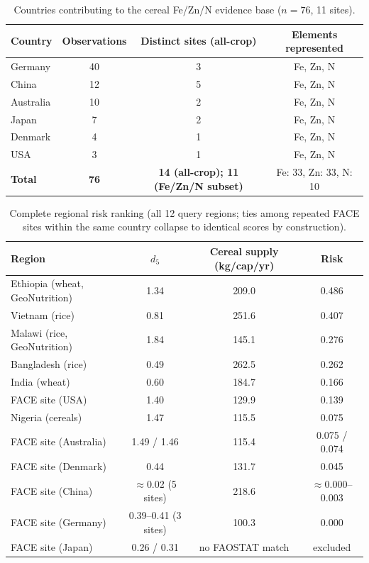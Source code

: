 \documentclass{article}
\begin{document}
\begin{table}[h]
\centering
\small
\caption{Countries contributing to the cereal Fe/Zn/N evidence base ($n=76$, 11 sites).}
\label{tab:sites}
\begin{tabular}{lccc}
\toprule
Country & Observations & Distinct sites (all-crop) & Elements represented \\
\midrule
Germany   & 40 & 3 & Fe, Zn, N \\
China     & 12 & 5 & Fe, Zn, N \\
Australia & 10 & 2 & Fe, Zn, N \\
Japan     & 7  & 2 & Fe, Zn, N \\
Denmark   & 4  & 1 & Fe, Zn, N \\
USA       & 3  & 1 & Fe, Zn, N \\
\midrule
\textbf{Total} & \textbf{76} & \textbf{14 (all-crop); 11 (Fe/Zn/N subset)} & Fe: 33, Zn: 33, N: 10 \\
\bottomrule
\end{tabular}
\end{table}

\begin{table}[h]
\centering
\small
\caption{Complete regional risk ranking (all 12 query regions; ties among repeated FACE sites within the same country collapse to identical scores by construction).}
\label{tab:full-risk}
\begin{tabular}{lccc}
\toprule
Region & $d_5$ & Cereal supply (kg/cap/yr) & Risk \\
\midrule
Ethiopia (wheat, GeoNutrition)   & 1.34 & 209.0 & 0.486 \\
Vietnam (rice)                   & 0.81 & 251.6 & 0.407 \\
Malawi (rice, GeoNutrition)      & 1.84 & 145.1 & 0.276 \\
Bangladesh (rice)                & 0.49 & 262.5 & 0.262 \\
India (wheat)                    & 0.60 & 184.7 & 0.166 \\
FACE site (USA)                  & 1.40 & 129.9 & 0.139 \\
Nigeria (cereals)                & 1.47 & 115.5 & 0.075 \\
FACE site (Australia)            & 1.49 / 1.46 & 115.4 & 0.075 / 0.074 \\
FACE site (Denmark)              & 0.44 & 131.7 & 0.045 \\
FACE site (China)                & $\approx$0.02 (5 sites) & 218.6 & $\approx$0.000--0.003 \\
FACE site (Germany)              & 0.39--0.41 (3 sites) & 100.3 & 0.000 \\
FACE site (Japan)                & 0.26 / 0.31 & no FAOSTAT match & excluded \\
\bottomrule
\end{tabular}
\end{table}
\end{document}
